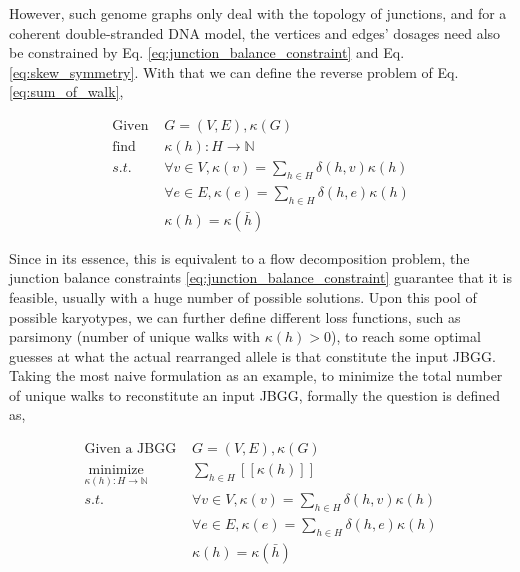 \documentclass[phd,tocprelim]{cornell}
\begin{document}
However, such genome graphs only deal with the topology of junctions, and for a coherent double-stranded DNA model, the vertices and edges' dosages need also be constrained by Eq. \ref{eq:junction_balance_constraint} and Eq. \ref{eq:skew_symmetry}. With that we can define the reverse problem of Eq. \ref{eq:sum_of_walk},

\begin{equation} \label{eq:walk_decomposition}
    \begin{aligned}
        \text{Given } & G = (V, E), \kappa(G) \\
        \text{find } & \kappa(h):H \rightarrow \mathbb{N} \\
        s.t. & \forall v \in V, \kappa(v) = \sum_{h \in H}\delta(h,v)\kappa(h) \\
        & \forall e \in E, \kappa(e) = \sum_{h \in H}\delta(h,e)\kappa(h) \\
        & \kappa(h) = \kappa(\bar{h})
    \end{aligned}
\end{equation}

Since in its essence, this is equivalent to a flow decomposition problem, the junction balance constraints \ref{eq:junction_balance_constraint} guarantee that it is feasible, usually with a huge number of possible solutions. Upon this pool of possible karyotypes, we can further define different loss functions, such as parsimony (number of unique walks with $\kappa(h)>0$), to reach some optimal guesses at what the actual rearranged allele is that constitute the input JBGG. Taking the most naive formulation as an example, to minimize the total number of unique walks to reconstitute an input JBGG, formally the question is defined as,

\begin{equation} \label{eq:walk_decomposition_parsimony}
    \begin{aligned}
        \text{Given a JBGG } & G = (V, E), \kappa(G) \\
        \underset{\kappa(h):H \rightarrow \mathbb{N}}{\text{minimize}} & \sum_{h \in H} [\![ \kappa(h) ]\!] \\
        s.t. & \forall v \in V, \kappa(v) = \sum_{h \in H}\delta(h,v)\kappa(h) \\
        & \forall e \in E, \kappa(e) = \sum_{h \in H}\delta(h,e)\kappa(h) \\
        & \kappa(h) = \kappa(\bar{h})
    \end{aligned}
\end{equation}
\end{document}
